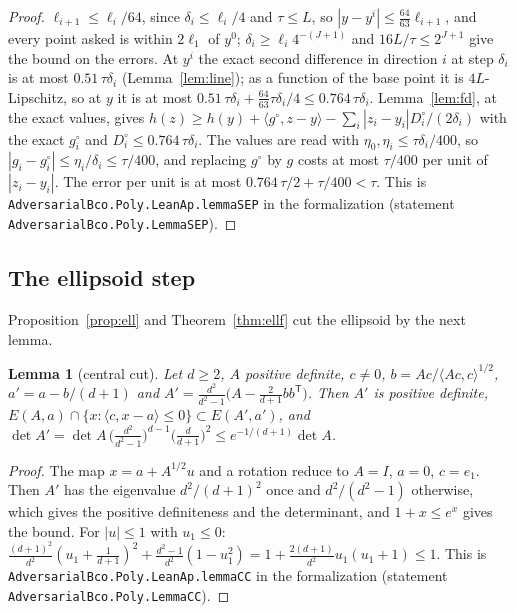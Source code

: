 \documentclass[11pt]{amsart}
\newtheorem{lemma}[theorem]{Lemma}
\theoremstyle{definition}
\numberwithin{equation}{section}
\newcommand{\ip}[1]{\langle #1\rangle}
\begin{document}
\begin{proof}
$\ell_{i+1}\le\ell_i/64$, since $\delta_i\le\ell_i/4$ and $\tau\le L$, so $|y-y^i|\le\frac{64}{63}\ell_{i+1}$, and every point asked is within $2\ell_1$ of $y^0$; $\delta_i\ge\ell_i4^{-(J+1)}$ and $16L/\tau\le2^{J+1}$ give the bound on the errors. At $y^i$ the exact second difference in direction $i$ at step $\delta_i$ is at most $0.51\,\tau\delta_i$ (Lemma~\ref{lem:line}); as a function of the base point it is $4L$-Lipschitz, so at $y$ it is at most $0.51\,\tau\delta_i+\frac{64}{63}\tau\delta_i/4\le0.764\,\tau\delta_i$. Lemma~\ref{lem:fd}, at the exact values, gives $h(z)\ge h(y)+\ip{g^\circ,z-y}-\sum_i|z_i-y_i|D^\circ_i/(2\delta_i)$ with the exact $g^\circ_i$ and $D^\circ_i\le0.764\,\tau\delta_i$. The values are read with $\eta_0,\eta_i\le\tau\delta_i/400$, so $|g_i-g^\circ_i|\le\eta_i/\delta_i\le\tau/400$, and replacing $g^\circ$ by $g$ costs at most $\tau/400$ per unit of $|z_i-y_i|$. The error per unit is at most $0.764\,\tau/2+\tau/400<\tau$.
This is \texttt{AdversarialBco.Poly.LeanAp.lemmaSEP} in the formalization (statement \texttt{AdversarialBco.Poly.LemmaSEP}).
\end{proof}

\subsection{The ellipsoid step}

Proposition~\ref{prop:ell} and Theorem~\ref{thm:ellf} cut the ellipsoid by the next lemma.

\begin{lemma}[central cut]\label{lem:cc}
Let $d\ge2$, $A$ positive definite, $c\ne0$, $b=Ac/\ip{Ac,c}^{1/2}$, $a'=a-b/(d+1)$ and $A'=\frac{d^2}{d^2-1}\bigl(A-\frac2{d+1}bb^{\mathsf T}\bigr)$. Then $A'$ is positive definite, $E(A,a)\cap\{x:\ip{c,x-a}\le0\}\subset E(A',a')$, and $\det A'=\det A\,\bigl(\frac{d^2}{d^2-1}\bigr)^{d-1}\bigl(\frac d{d+1}\bigr)^2\le e^{-1/(d+1)}\det A$.
\end{lemma}

\begin{proof}
The map $x=a+A^{1/2}u$ and a rotation reduce to $A=I$, $a=0$, $c=e_1$. Then $A'$ has the eigenvalue $d^2/(d+1)^2$ once and $d^2/(d^2-1)$ otherwise, which gives the positive definiteness and the determinant, and $1+x\le e^x$ gives the bound. For $|u|\le1$ with $u_1\le0$: $\frac{(d+1)^2}{d^2}(u_1+\frac1{d+1})^2+\frac{d^2-1}{d^2}(1-u_1^2)=1+\frac{2(d+1)}{d^2}u_1(u_1+1)\le1$.
This is \texttt{AdversarialBco.Poly.LeanAp.lemmaCC} in the formalization (statement \texttt{AdversarialBco.Poly.LemmaCC}).
\end{proof}
\end{document}
